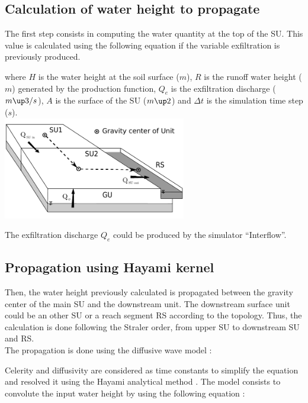 \subsection{Calculation of water height to propagate}
The first step consists in computing the water quantity at the top of the SU. This value is calculated using the following equation if the variable exfiltration is previously produced.



where $H$ is the water height at the soil surface ($m$), $R$ is the runoff water height ($m$) generated by the production function, $Q_e$ is the exfiltration discharge ($m\up3/s$), $A$ is the surface of the SU ($m\up2$) and $\Delta t$ is the simulation time step ($s$).\\

\includegraphics[width=8cm]{common/Schema_GU_RS_SU_Hayami_SU.pdf}

The exfiltration discharge $Q_e$ could be produced by the simulator ``Interflow''.\\


\subsection{Propagation using Hayami kernel}
Then, the water height previously calculated is propagated between the gravity center of the main SU and the downstream unit. The downstream surface unit could be an other SU or a reach segment RS according to the topology. Thus, the calculation is done following the Straler order, from upper SU to downstream SU and RS.\\

The propagation is done using the diffusive wave model :



Celerity and diffusivity are considered as time constants to simplify the equation and resolved it using the Hayami analytical method \cite{Moussa1996}. The model consists to convolute the input water height by using the following equation :

